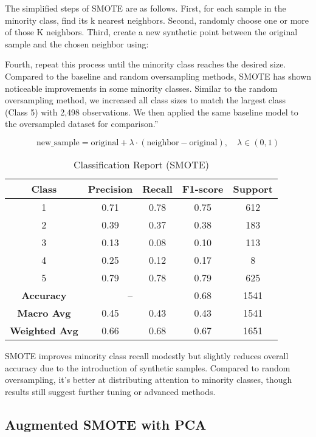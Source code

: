 The simplified steps of SMOTE are as follows. First, for each sample in the minority class, find its k nearest neighbors. 
Second, randomly choose one or more of those K neighbors. Third, create a new synthetic point between the original sample and the chosen neighbor using:

Fourth, repeat this process until the minority class reaches the desired size.
Compared to the baseline and random oversampling methods, SMOTE has shown noticeable improvements in some minority classes.
Similar to the random oversampling method, we increased all class sizes to match the largest class (Class 5) with 2,498 observations.
 We then applied the same baseline model to the oversampled dataset for comparison.”

\[
\text{new\_sample} = \text{original} + \lambda \cdot (\text{neighbor} - \text{original}), \quad \lambda \in (0, 1)
\]

\begin{table}[!h]
\centering
\caption{Classification Report (SMOTE)}
\label{tab:smote_imbalanced}
\begin{tabular}{|c|c|c|c|c|}
\hline
\textbf{Class} & \textbf{Precision} & \textbf{Recall} & \textbf{F1-score} & \textbf{Support} \\
\hline
1 & 0.71 & 0.78 & 0.75 & 612 \\
2 & 0.39 & 0.37 & 0.38 & 183 \\
3 & 0.13 & 0.08 & 0.10 & 113 \\
4 & 0.25 & 0.12 & 0.17 & 8 \\
5 & 0.79 & 0.78 & 0.79 & 625 \\
\hline
\textbf{Accuracy} & \multicolumn{2}{|c|}{--} & 0.68 & 1541 \\
\hline
\textbf{Macro Avg} & 0.45 & 0.43 & 0.43 & 1541 \\
\textbf{Weighted Avg} & 0.66 & 0.68 & 0.67 &  1651 \\
\hline
\end{tabular}
\end{table}

SMOTE improves minority class recall modestly but slightly reduces overall accuracy due to the introduction of synthetic samples. 
Compared to random oversampling, it's better at distributing attention to minority classes, though results still suggest further tuning or advanced methods. 

\subsection{Augmented SMOTE with PCA}

